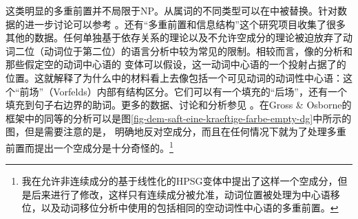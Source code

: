 这类明显的多重前置并不局限于NP。从属词的不同类型可以在\vfc 中被替换。针对数据的进一步讨论可以参考 。还有“多重前置和信息结构”这个研究项目收集了很多其他的数据\citep{Bildhauer2011a}。任何单独基于依存关系的理论以及不允许空成分的理论被迫放弃了动词二位（动词位于第二位）的语言分析中较为常见的限制。相较而言，像\gbc 的分析和那些假定空的动词中心语的\hpsgc
变体可以假设，这一动词中心语的一个投射占据了\vfc 的位置。这就解释了为什么\vfc 中的材料看上去像包括一个可见动词的动词性中心语：这个“前场”（Vorfelds）内部有结构区分。它们可以有一个填充的“后场”，还有一个填充到句子右边界的助词。更多的数据、讨论和分析参见 。在Gross \& Osborne的框架\citeyearpar{GO2009a}中的同等的分析可以是图\vref{fig-dem-saft-eine-kraeftige-farbe-empty-dg}中所示的图，但是需要注意的是， \citet[]{GO2009a}明确地反对空成分，而且在任何情况下就为了处理多重前置而提出一个空成分是十分奇怪的。\footnote{%
我在允许非连续成分的基于线性化的HPSG变体中提出了这样一个空成分\citep{Mueller2002c}，但是后来进行了修改，这样只有连续成分被允准，动词位置被处理为中心语移位，以及动词移位分析中使用的包括相同的空动词性中心语的多重前置\citep{Mueller2005d,MuellerGS}。
}
